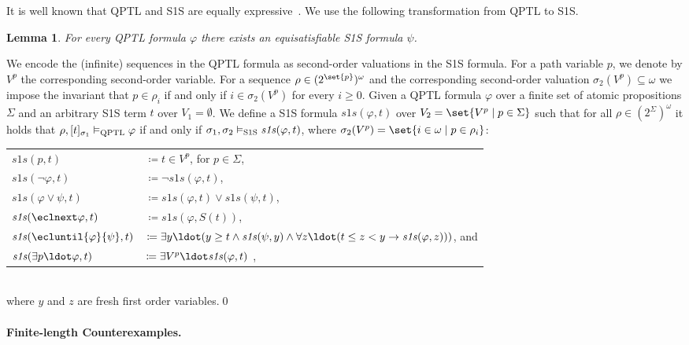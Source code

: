 \documentclass{LMCS}
\newcommand{\modelsqptl}{\vDash_\text{\rm QPTL}}
\newcommand{\modelssos}{\vDash_\text{\rm S1S}}
\newcommand{\sostransformer}{\mathit{s1s}}
\theoremstyle{plain}\newtheorem{theorem}[thm]{Theorem}
\theoremstyle{plain}\newtheorem{lemma}[thm]{Lemma}
\theoremstyle{plain}\newtheorem{proposition}[thm]{Proposition}
\theoremstyle{plain}\newtheorem{corollary}[thm]{Corollary}
\theoremstyle{definition}\newtheorem{definition}{Definition}[section]
\begin{document}
It is well known that QPTL and S1S are equally expressive~\cite{DBLP:conf/icalp/SistlaVW85}.
We use the following transformation from QPTL to S1S.
\begin{lemma} \label{thm:qptl_to_s1s}
  For every QPTL formula $\varphi$ there exists an equisatisfiable S1S formula $\psi$.
\end{lemma}
\proof
We encode the (infinite) sequences in the QPTL formula as second-order valuations in the S1S formula.
For a path variable $p$, we denote by $V^p$ the corresponding second-order variable.
For a sequence $\rho \in (2^\set{p})^\omega$ and the corresponding second-order valuation $\sigma_2(V^p) \subseteq \omega$ we impose the invariant that $p \in \rho_i$ if and only if $i \in \sigma_2(V^p)$ for every $i \geq 0$.
Given a QPTL formula $\varphi$ over a finite set of atomic propositions $\Sigma$ and an arbitrary S1S term $t$ over $V_1 = \emptyset$.
We define a S1S formula $\sostransformer(\varphi,t)$ over $V_2 = \set{V^p \mid p \in \Sigma}$ such that for all $\rho \in (2^\Sigma)^\omega$ it holds that $\rho,[t]_{\sigma_1} \modelsqptl \varphi$ if and only if $\sigma_1,\sigma_2 \modelssos \sostransformer(\varphi,t)$, where $\sigma_2(V^p) = \set{i \in \omega \mid p \in \rho_i}$:\smallskip\\
\begin{tabular}{L l}
  $\sostransformer(p,t)$ & $\coloneqq t \in V^p$, for $p \in \Sigma$,\\[1pt]
  $\sostransformer(\neg\varphi, t)$ & $\coloneqq \neg \sostransformer(\varphi,t)$,\\[1pt]
  $\sostransformer(\varphi \lor \psi, t)$ & $\coloneqq \sostransformer(\varphi,t) \lor \sostransformer(\psi,t)$,\\[1pt]
  $\sostransformer(\eclnext \varphi, t)$ & $\coloneqq \sostransformer(\varphi,S(t))$,\\[1pt]
  $\sostransformer(\ecluntil{\varphi}{\psi}, t)$ & $\coloneqq \exists y \ldot (y \geq t \land \sostransformer(\psi,y) \land \forall z \ldot (t \leq z < y \rightarrow \sostransformer(\varphi,z)))$, and\\[1pt]
  $\sostransformer(\exists p \ldot \varphi, t)$ & $\coloneqq \exists V^p \ldot \sostransformer(\varphi,t)$ \enspace,
\end{tabular}\smallskip\\
where $y$ and $z$ are fresh first order variables.\qed

\paragraph{\bf Finite-length Counterexamples.}
\end{document}
